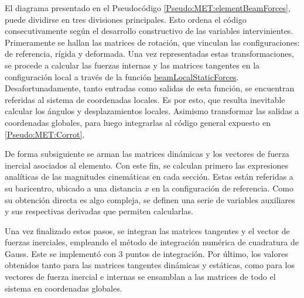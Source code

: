 El diagrama presentado en el Pseudocódigo \ref{Pseudo:MET:elementBeamForces}, puede dividirse en tres divisiones principales. Esto ordena el código consecutivamente según el desarrollo constructivo de las variables intervinientes. Primeramente se hallan las matrices de rotación, que vinculan las configuraciones: de referencia, rígida y deformada. Una vez representadas estas transformaciones, se procede a calcular las fuerzas internas y las matrices tangentes en la configuración local a través de la función \href{https://github.com/ONSAS/ONSAS/blob/master/src/beamLocalStaticForces.m}{beamLocalStaticForces}. Desafortunadamente, tanto entradas como salidas de esta función, se encuentran referidas al sistema de coordenadas locales. Es por esto, que resulta inevitable calcular los ángulos y desplazamientos locales. Asimismo transformar las salidas a coordenadas globales, para luego integrarlas al código general expuesto en \ref{Pseudo:MET:Corrot}.

De forma subsiguiente se arman las matrices dinámicas y los vectores de fuerza inercial asociados al elemento. Con este fin, se calculan primero las expresiones analíticas de las magnitudes cinemáticas en cada sección. Estas están referidas a su baricentro, ubicado a una distancia $x$ en la configuración de referencia. Como su obtención directa es algo compleja, se definen una serie de variables auxiliares y sus respectivas derivadas que permiten calcularlas.  

Una vez finalizado estos pasos, se integran las matrices tangentes y el vector de fuerzas inerciales, empleando el método de integración numérica de cuadratura de Gauss. Este se implementó con 3 puntos de integración. Por último, los valores obtenidos tanto para las matrices tangentes dinámicas y estáticas,  como para los vectores de fuerza inercial e internas se ensamblan a las matrices de todo el sistema en coordenadas globales.
